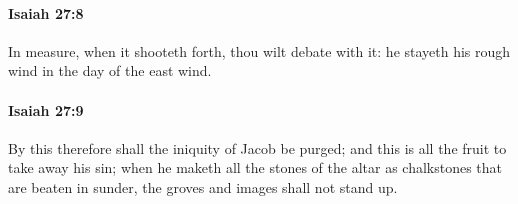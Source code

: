 		\paragraph{Isaiah 27:8} %
			\label{ISAIAH-27-8}

			In measure, when it shooteth forth, thou wilt debate with it: he stayeth his rough wind in the day of the east wind.


		\paragraph{Isaiah 27:9} %
			\label{ISAIAH-27-9}

			By this therefore shall the iniquity of Jacob be purged; and this is all the fruit to take away his sin; when he maketh all the stones of the altar as chalkstones that are beaten in sunder, the groves and images shall not stand up.


